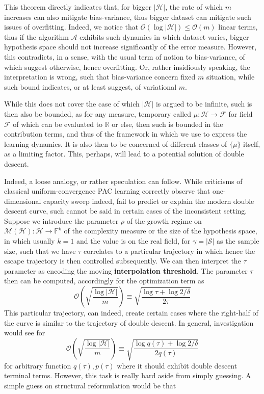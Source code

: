 \documentclass[
  journal=largetwo,
  year=2025,
  volume=37,
]{cup-journal}
\begin{document}
This theorem directly indicates that, for bigger $|\mathcal{H}|$, the rate of which $m$ increases can also mitigate bias-variance, thus bigger dataset can mitigate such issues of overfitting. Indeed, we notice that $\mathcal{O}(\log{|\mathcal{H}|})\leq\mathcal{O}(m)$ linear terms, thus if the algorithm $\mathcal{A}$ exhibits such dynamics in which dataset varies, bigger hypothesis space should not increase significantly of the error measure. However, this contradicts, in a sense, with the usual term of notion to bias-variance, of which suggest otherwise, hence overfitting. Or, rather insidiously speaking, the interpretation is wrong, such that bias-variance concern fixed $m$ situation, while such bound indicates, or at least suggest, of variational $m$. 

While this does not cover the case of which $|\mathcal{H}|$ is argued to be infinite, such is then also be bounded, as for any measure, temporary called $\mu: \mathcal{H}\to \mathcal{F}$ for field $\mathcal{F}$ of which can be evaluated to $\mathbb{R}$ or else, then such is bounded in the contribution terms, and thus of the framework in which we use to express the learning dynamics. It is also then to be concerned of different classes of $\{\mu\}$ itself, as a limiting factor. This, perhaps, will lead to a potential solution of double descent. 

Indeed, a loose analogy, or rather speculation can follow. While criticisms of classical uniform-convergence PAC learning correctly observe that one-dimensional capacity sweep indeed, fail to predict or explain the modern double descent curve, such cannot be said in certain cases of the inconsistent setting. Suppose we introduce the parameter $\rho$ of the growth regime on $\mathcal{M}(\mathcal{H}):\mathcal{H}\to \mathbb{F}^{k}$ of the complexity measure or the size of the hypothesis space, in which usually $k=1$ and the value is on the real field, for $\gamma=|\mathcal{S}|$ as the sample size, such that we have $\tau$ correlates to a particular trajectory in which 
hence the escape trajectory is then controlled subsequently. We can then interpret the $\tau$ parameter as encoding the moving \textbf{interpolation threshold}. The parameter $\tau$ then can be computed, accordingly for the optimization term as 
\begin{equation}
    \mathcal{O}\left(\sqrt{\frac{\log{|\mathcal{H}|}}{m}}\right) \equiv \sqrt{\frac{\log{\tau}+ \log{2/\delta}}{2\tau}}
\end{equation}
This particular trajectory, can indeed, create certain cases where the right-half of the curve is similar to the trajectory of double descent. In general, investigation would see for 
\begin{equation}
    \mathcal{O}\left(\sqrt{\frac{\log{|\mathcal{H}|}}{m}}\right) \equiv \sqrt{\frac{\log{q(\tau)}+ \log{2/\delta}}{2q(\tau)}}
\end{equation}
for arbitrary function $q(\tau),p(\tau)$ where it should exhibit double descent terminal terms. However, this task is really hard aside from simply guessing. A simple guess on structural reformulation would be that 
\end{document}
